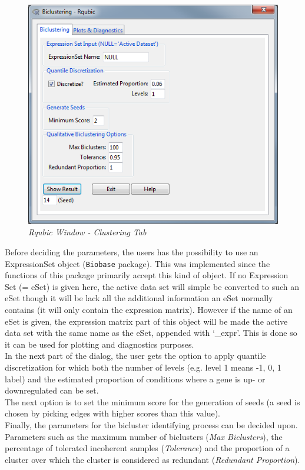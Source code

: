 \documentclass[a4paper]{article}\usepackage[]{graphicx}\usepackage[]{color}
\begin{document}
\begin{figure}[H]
\centering
\includegraphics[scale=0.5]{figures/rqubic_clusttab.png}
\caption{{\it Rqubic Window - Clustering Tab}\label{rqubic_clusttab}}
\end{figure}
\noindent Before deciding the parameters, the users has the possibility to use
an ExpressionSet object (\verb|Biobase| package). This was implemented since the
functions of this package primarily accept this kind of object. If no Expression
Set (= eSet) is given here, the active data set will simple be converted to such an
eSet though it will be lack all the additional information an eSet normally
contains (it will only contain the expression matrix). However if the name of an
eSet is given, the expression matrix part of this object will be made the active
data set with the same name as the eSet, appended with `\_expr'. This is done so
it can be used for plotting and diagnostics purposes.\\
In the next part of the dialog, the user gets the option to apply quantile
discretization for which both the number of levels (e.g. level 1 means -1,
0, 1 label) and the estimated proportion of conditions where a gene is up- or
downregulated can be set.\\
The next option is to set the minimum score for the generation of seeds 
(a seed is chosen by picking edges with higher scores than this value).\\
Finally, the parameters for the bicluster identifying process can be decided
upon. Parameters such as the maximum number of biclusters ({\it Max Biclusters}), the percentage of
tolerated incoherent samples ({\it Tolerance}) and the proportion of a cluster over which the
cluster is considered as redundant ({\it Redundant Proportion}).
\end{document}
